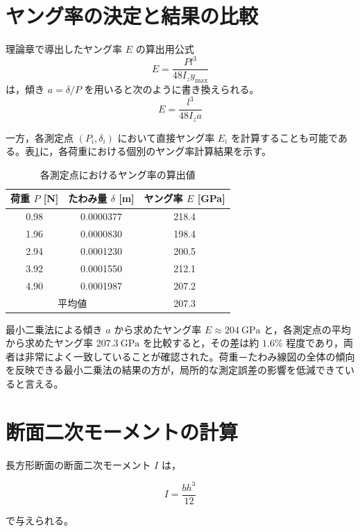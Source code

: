 \documentclass[10pt,a4paper,titlepage]{jreport}
\begin{document}
\section{ヤング率の決定と結果の比較}

理論章で導出したヤング率 $E$ の算出用公式
\begin{equation}
    E = \frac{Pl^3}{48 I_z y_{\max}}
\end{equation}
は，傾き $a = \delta / P$ を用いると次のように書き換えられる。
\begin{equation}
    E = \frac{l^3}{48 I_z a}
\end{equation}

一方，各測定点 $(P_i, \delta_i)$ において直接ヤング率 $E_i$ を計算することも可能である。表\ref{tab:each_young}に，各荷重における個別のヤング率計算結果を示す。

\begin{table}[H]
\centering
\caption{各測定点におけるヤング率の算出値}
\label{tab:each_young}
\begin{tabular}{|c|c|c|}
\hline
荷重 $P$ [N] & たわみ量 $\delta$ [m] & ヤング率 $E$ [GPa] \\ \hline
0.98 & 0.0000377 & 218.4 \\ \hline
1.96 & 0.0000830 & 198.4 \\ \hline
2.94 & 0.0001230 & 200.5 \\ \hline
3.92 & 0.0001550 & 212.1 \\ \hline
4.90 & 0.0001987 & 207.2 \\ \hline
\multicolumn{2}{|c|}{平均値} & 207.3 \\ \hline
\end{tabular}
\end{table}

最小二乗法による傾き $a$ から求めたヤング率 $E \approx 204\ \mathrm{GPa}$ と，各測定点の平均から求めたヤング率 $207.3\ \mathrm{GPa}$ を比較すると，その差は約 $1.6\%$ 程度であり，両者は非常によく一致していることが確認された。荷重－たわみ線図の全体の傾向を反映できる最小二乗法の結果の方が，局所的な測定誤差の影響を低減できていると言える。

\section{断面二次モーメントの計算}

長方形断面の断面二次モーメント $I$ は，

\[
I=\frac{bh^3}{12}
\]

で与えられる。
\end{document}
